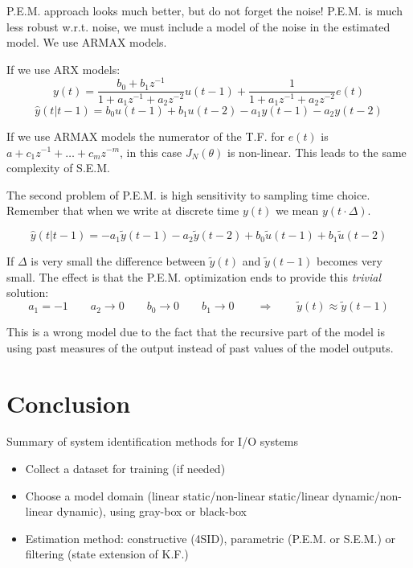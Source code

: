 P.E.M. approach looks much better, but do not forget the noise! P.E.M. is much less robust w.r.t. noise, we must include a model of the noise in the estimated model.
We use ARMAX models.

If we use ARX models:
\[
    y(t) = \frac{b_0+b_1z^{-1}}{1+a_1z^{-1}+a_2z^{-2}}u(t-1) + \frac{1}{1+a_1z^{-1}+a_2z^{-2}}e(t)
\]
\[
    \hat{y}(t|t-1) = b_0u(t-1)+b_1u(t-2) - a_1y(t-1)-a_2y(t-2)
\]

If we use ARMAX models the numerator of the T.F. for $e(t)$ is $a+c_1z^{-1}+\ldots+c_mz^{-m}$, in this case $J_N(\theta)$ is non-linear.
This leads to the same complexity of S.E.M.

The second problem of P.E.M. is high sensitivity to sampling time choice.
Remember that when we write at discrete time $y(t)$ we mean $y(t\cdot \Delta)$.

\[
    \hat{y}(t|t-1) = -a_1\tilde{y}(t-1)-a_2\tilde{y}(t-2) + b_0\tilde{u}(t-1)+b_1\tilde{u}(t-2)
\]

If $\Delta$ is very small the difference between $\tilde{y}(t)$ and $\tilde{y}(t-1)$ becomes very small.
The effect is that the P.E.M. optimization ends to provide this \emph{trivial} solution:
\[
    a_1 = -1 \qquad a_2 \rightarrow 0 \qquad b_0 \rightarrow 0 \qquad b_1 \rightarrow 0 \qquad \Rightarrow \qquad \tilde{y}(t) \approx \tilde{y}(t-1)
\]

This is a wrong model due to the fact that the recursive part of the model is using past measures of the output instead of past values of the model outputs.

\section{Conclusion}

Summary of system identification methods for I/O systems
\begin{figure}[H]
    \centering
\end{figure}

\begin{itemize}
    \item Collect a dataset for training (if needed)
    \item Choose a model domain (linear static/non-linear static/linear dynamic/non-linear dynamic), using gray-box or black-box
    \item Estimation method: constructive (4SID), parametric (P.E.M. or S.E.M.) or filtering (state extension of K.F.)
\end{itemize}

